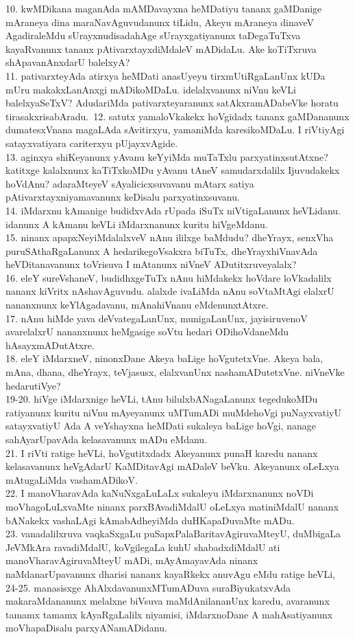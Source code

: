 \documentclass{article}
\begin{document}
10. kwMDikana maganAda mAMDavayxna heMDatiyu tananx gaMDanige mAraneya dina maraNavAguvudanunx tiLidu, Akeyu mAraneya dinaveV AgadiraleMdu sUrayxnudisadahAge sUrayxgatiyanunx taDegaTuTxva kayaRvanunx tananx pAtivarxtayxdiMdaleV mADidaLu. Ake koTiTxruva shApavanAnxdarU balelxyA?\\
11. pativarxteyAda atirxya heMDati anasUyeyu tirxmUtiRgaLanUnx kUDa mUru makakxLanAnxgi mADikoMDaLu. idelalxvanunx niVnu keVLi balelxyaSeTxV? AdudariMda pativarxteyaranunx satAkxramADabeVke horatu tirasakxrisabAradu.\
12. satutx yamaloVkakekx hoVgidadx tananx gaMDananunx dumatesxVnana magaLAda sAvitirxyu, yamaniMda karesikoMDaLu. I riVtiyAgi satayxvatiyara cariterxyu pUjayxvAgide.\\
13. aginxya shiKeyanunx yAvanu keYyiMda muTaTxlu parxyatinxsutAtxne? katitxge kalalxnunx kaTiTxkoMDu yAvanu tAneV samudarxdalilx Ijuvudakekx hoVdAnu? adaraMteyeV sAyalicicxsuvavanu mAtarx satiya pAtivarxtayxniyamavanunx keDisalu parxyatinxsuvanu.\\
14. iMdarxnu kAmanige budidxvAda rUpada iSuTx niVtigaLanunx heVLidanu. idanunx A kAmanu keVLi iMdarxnanunx kuritu hiVgeMdanu.\\
15. ninanx apapxNeyiMdalalxveV nAnu ililxge baMdudu? dheYrayx, senxVha puruSAthaRgaLanunx A hedarikegoVsakxra biTuTx, dheYrayxhiVnavAda heVDitanavanunx toVrisuva I mAtanunx niVneV ADutitxruveyalalx?\\
16. eleY sureVshaneV, budidhxgeTuTx nAnu hiMdakekx hoVdare loVkadalilx nananx kiVritx nAshavAguvudu. alalxde ivaLiMda nAnu soVtaMtAgi elalxrU nananxnunx keYlAgadavanu, mAnahiVnanu eMdenunxtAtxre.\\
17. nAnu hiMde yava deVvategaLanUnx, munigaLanUnx, jayisiruvenoV avarelalxrU nananxnunx heMgasige soVtu hedari ODihoVdaneMdu hAsayxmADutAtxre.\\
18. eleY iMdarxneV, ninonxDane Akeya baLige hoVgutetxVne. Akeya bala, mAna, dhana, dheYrayx, teVjasusx, elalxvanUnx nashamADutetxVne. niVneVke hedarutiVye?\\
19-20. hiVge iMdarxnige heVLi, tAnu bilulxbANagaLanunx tegedukoMDu ratiyanunx kuritu niVnu mAyeyanunx uMTumADi muMdehoVgi puNayxvatiyU satayxvatiyU Ada A veYshayxna heMDati sukaleya baLige hoVgi, nanage sahAyarUpavAda kelasavanunx mADu eMdanu.\\
21. I riVti ratige heVLi, hoVgutitxdadx Akeyanunx punaH karedu nananx kelasavanunx heVgAdarU KaMDitavAgi mADaleV beVku. Akeyanunx oLeLxya mAtugaLiMda vashamADikoV.\\
22. I manoVharavAda kaNuNxgaLuLaLx sukaleyu iMdarxnanunx noVDi moVhagoLuLxvaMte ninanx parxBAvadiMdalU oLeLxya matiniMdalU nananx bANakekx vashaLAgi kAmabAdheyiMda duHKapaDuvaMte mADu.\\
23. vanadalilxruva vaqkaSxgaLu puSapxPalaBaritavAgiruvaMteyU, duMbigaLa JeVMkAra ravadiMdalU, koVgilegaLa kuhU shabadxdiMdalU ati manoVharavAgiruvaMteyU mADi, mAyAmayavAda ninanx naMdanarUpavanunx dharisi nananx kayaRkekx anuvAgu eMdu ratige heVLi,\\
24-25. manasisxge AhAlxdavanunxMTumADuva suraBiyukatxvAda makaraMdananunx melalxne biVsuva maMdAnilananUnx karedu, avaranunx tamamx tamamx kAyaRgaLalilx niyamisi, iMdarxnoDane A mahAsatiyanunx moVhapaDisalu parxyANamADidanu.\\
\end{document}
